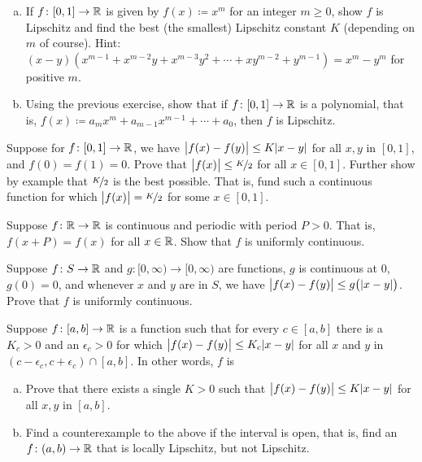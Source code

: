 \begin{exercise}
\pagebreak[2]
\leavevmode
\begin{enumerate}[a)]
\item
If $f \colon [0,1] \to {\mathbb{R}}$ is given by $f(x) \coloneqq x^m$ for an integer
$m \geq 0$,
show $f$ is Lipschitz and find the best (the smallest) Lipschitz constant
$K$ (depending on $m$ of course).
Hint:
$(x-y)(x^{m-1} + x^{m-2}y + x^{m-3}y^2 + \cdots + x y^{m-2} + y^{m-1}) = x^m
- y^m$ for positive $m$.
\item
Using the previous exercise, show that if $f \colon [0,1] \to {\mathbb{R}}$
is a polynomial, that is, $f(x) \coloneqq a_m x^m + a_{m-1} x^{m-1} + \cdots + a_0$,
then $f$ is Lipschitz.
\end{enumerate}
\end{exercise}

\begin{exercise}
\pagebreak[2]
Suppose for $f \colon [0,1] \to {\mathbb{R}}$, we have $\bigl\lvert {f(x)-f(y)} \bigr\rvert \leq K
\lvert {x-y} \rvert$ for all $x,y$ in $[0,1]$,
and $f(0) = f(1) = 0$.
Prove that $\bigl\lvert {f(x)} \bigr\rvert \leq \nicefrac{K}{2}$ for all $x \in [0,1]$.  Further show by example that
$\nicefrac{K}{2}$ is the best possible.
That is, fund such a continuous function
for which $\bigl\lvert {f(x)} \bigr\rvert = \nicefrac{K}{2}$ for some $x \in [0,1]$.
\end{exercise}

\begin{exercise}
Suppose $f \colon {\mathbb{R}} \to {\mathbb{R}}$ is continuous and periodic with period
$P > 0$.  That is, $f(x+P) = f(x)$ for all $x \in {\mathbb{R}}$.  Show that $f$
is uniformly continuous.
\end{exercise}

\begin{exercise}
Suppose $f \colon S \to {\mathbb{R}}$ and $g \colon [0,\infty) \to [0,\infty)$
are functions, $g$ is continuous at $0$, $g(0) = 0$, and
whenever $x$ and $y$ are in $S$, we have $\bigl\lvert {f(x)-f(y)} \bigr\rvert \leq
g\bigl(\lvert {x-y} \rvert\bigr)$.
Prove that $f$ is uniformly continuous.
\end{exercise}

\begin{exercise}
Suppose $f \colon [a,b] \to {\mathbb{R}}$ is a function such that for every $c \in
[a,b]$ there is a $K_c > 0$ and an $\epsilon_c > 0$ for which
$\bigl\lvert {f(x)-f(y)} \bigr\rvert \leq K_c \lvert {x-y} \rvert$ for all $x$ and $y$ in
$(c-\epsilon_c,c+\epsilon_c) \cap [a,b]$.  In other words, $f$ is
\begin{enumerate}[a)]
\item
Prove that there exists a single $K > 0$ such that
$\bigl\lvert {f(x)-f(y)} \bigr\rvert \leq K \lvert {x-y} \rvert$ for all $x,y$ in $[a,b]$.
\item
Find a counterexample to the above if the interval is open, that is,
find an $f \colon (a,b) \to {\mathbb{R}}$ that is locally Lipschitz, but not
Lipschitz.
\end{enumerate}
\end{exercise}

